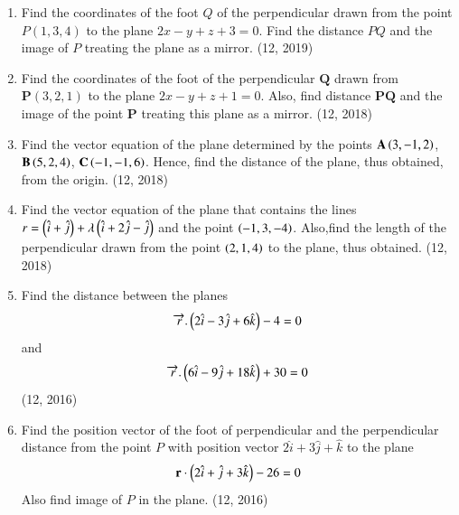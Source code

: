 \begin{enumerate}[label=\thesubsection.\arabic*, ref=\thesubsection.\theenumi]
	\item Find the coordinates of the foot $Q$ of the perpendicular drawn from the point $P(1, 3, 4)$ to the plane $2x - y + z + 3 = 0$. Find the distance $PQ$ and the image of $P$ treating the plane as a mirror. \hfill (12, 2019)
\item Find the coordinates of the foot of the perpendicular $\mathbf{Q}$ drawn from $\mathbf{P}(3, 2, 1)$ to the plane $2x - y + z + 1 = 0$. Also, find distance $\mathbf{PQ}$ and the image of the point $\mathbf{P}$ treating this plane as a mirror.
\hfill (12, 2018)
\item Find the vector equation of the plane determined by the points $\mathbf{A}\left(3,-1,2\right)$, $\mathbf{B}\left(5,2,4\right)$, $\mathbf{C}\left(-1,-1,6\right)$. Hence, find the distance of the plane, thus obtained, from the origin.
\hfill (12, 2018)
\item Find the vector equation of the plane that contains the lines $r=\left(\hat{i}+\hat{j}\right)+\lambda \left(\hat{i}+2\hat{j} - \hat{j}\right)$ and the point $\left(-1,3,-4\right)$. Also,find the length of the perpendicular drawn from the point $\left(2,1,4\right)$ to the plane, thus obtained.
\hfill (12, 2018) 
\item Find the distance between the planes
      \begin{align*}
          \overrightarrow{r}.\begin{pmatrix}2\hat{i}-3\hat{j}+6\hat{k} \end{pmatrix} - 4 =0
      \end{align*}
      and
      \begin{align*}
          \overrightarrow{r}.\begin{pmatrix}6\hat{i}-9\hat{j} +18\hat{k}\end{pmatrix} +30 =0
      \end{align*}
      \hfill (12, 2016)
\item Find the position vector of the foot of perpendicular and the perpendicular distance from the point $P$ with position vector $2\hat{i}+3\hat{j}+\hat{k}$ to the plane
      \begin{align*}
          \mathbf{r}\cdot\left(2\hat{i}+\hat{j}+3\hat{k}\right) - 26=0
      \end{align*}
      Also find image of $P$ in the plane. \hfill (12, 2016)
\end{enumerate}
